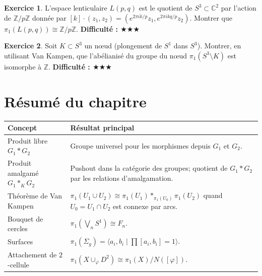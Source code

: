\documentclass[12pt,a4paper,openany]{book}
\theoremstyle{definition}
\newtheorem{exercice}{Exercice}[chapter]
\theoremstyle{plain}
\theoremstyle{remark}
\newcommand{\Z}{\mathbb{Z}}
\newcommand{\C}{\mathbb{C}}
\begin{document}
\begin{exercice}\label{exo:espace-lenticulaire}
L'espace lenticulaire $L(p, q)$ est le quotient de $S^3 \subset \C^2$ par l'action de
$\Z/p\Z$ donnée par $[k] \cdot (z_1, z_2) = (e^{2\pi i k/p} z_1, e^{2\pi i kq/p} z_2)$.
Montrer que $\pi_1(L(p,q)) \cong \Z/p\Z$.
\textbf{Difficulté : \(\bigstar\bigstar\bigstar\)}
\end{exercice}

\begin{exercice}\label{exo:complement-noeud}
Soit $K \subset S^3$ un n\oe ud (plongement de $S^1$ dans $S^3$). Montrer, en utilisant
Van Kampen, que l'abélianisé du groupe du n\oe ud $\pi_1(S^3 \setminus K)$ est isomorphe à $\Z$.
\textbf{Difficulté : \(\bigstar\bigstar\bigstar\)}
\end{exercice}

\section*{Résumé du chapitre}\label{sec:resume-ch3}

\begin{center}
\renewcommand{\arraystretch}{1.4}
\begin{tabular}{p{5cm} p{9cm}}
\toprule
\textbf{Concept} & \textbf{Résultat principal} \\
\midrule
Produit libre $G_1 * G_2$ &
Groupe universel pour les morphismes depuis $G_1$ et $G_2$. \\
Produit amalgamé $G_1 *_K G_2$ &
Pushout dans la catégorie des groupes; quotient de $G_1 * G_2$ par les relations d'amalgamation. \\
Théorème de Van Kampen &
$\pi_1(U_1 \cup U_2) \cong \pi_1(U_1) *_{\pi_1(U_0)} \pi_1(U_2)$
quand $U_0 = U_1 \cap U_2$ est connexe par arcs. \\
Bouquet de cercles &
$\pi_1\!\left(\bigvee_n S^1\right) \cong F_n$. \\
Surfaces &
$\pi_1(\Sigma_g) = \langle a_i, b_i \mid \prod [a_i, b_i] = 1 \rangle$. \\
Attachement de $2$-cellule &
$\pi_1(X \cup_\varphi D^2) \cong \pi_1(X) / N([\varphi])$. \\
\bottomrule
\end{tabular}
\end{center}
\end{document}
